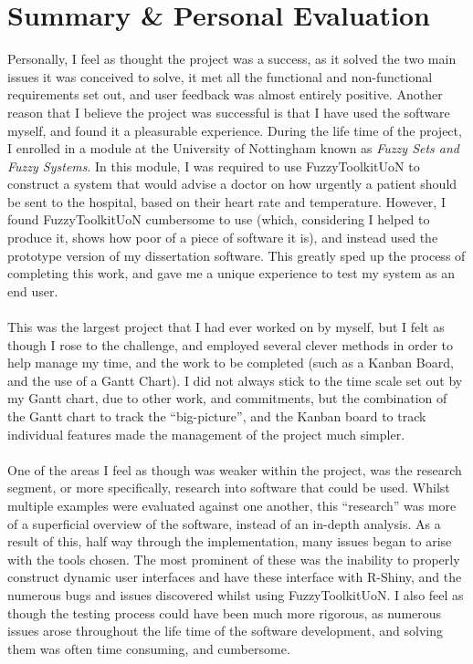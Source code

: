\section{Summary \& Personal Evaluation}
Personally, I feel as thought the project was a success, as it solved the two main issues it was conceived to solve, it met all the functional and non-functional requirements set out, and user feedback was almost entirely positive. Another reason that I believe the project was successful is that I have used the software myself, and found it a pleasurable experience. During the life time of the project, I enrolled in a module at the University of Nottingham known as \emph{Fuzzy Sets and Fuzzy Systems}\cite{uon2014fuz}. In this module, I was required to use FuzzyToolkitUoN to construct a system that would advise a doctor on how urgently a patient should be sent to the hospital, based on their heart rate and temperature. However, I found FuzzyToolkitUoN cumbersome to use (which, considering I helped to produce it, shows how poor of a piece of software it is), and instead used the prototype version of my dissertation software. This greatly sped up the process of completing this work, and gave me a unique experience to test my system as an end user.\ \\
\ \\
This was the largest project that I had ever worked on by myself, but I felt as though I rose to the challenge, and employed several clever methods in order to help manage my time, and the work to be completed (such as a Kanban Board, and the use of a Gantt Chart). I did not always stick to the time scale set out by my Gantt chart, due to other work, and commitments, but the combination of the Gantt chart to track the ``big-picture'', and the Kanban board to track individual features made the management of the project much simpler.\ \\
\ \\
One of the areas I feel as though was weaker within the project, was the research segment, or more specifically, research into software that could be used. Whilst multiple examples were evaluated against one another, this ``research'' was more of a superficial overview of the software, instead of an in-depth analysis. As a result of this, half way through the implementation, many issues began to arise with the tools chosen. The most prominent of these was the inability to properly construct dynamic user interfaces and have these interface with R-Shiny, and the numerous bugs and issues discovered whilst using FuzzyToolkitUoN. I also feel as though the testing process could have been much more rigorous, as numerous issues arose throughout the life time of the software development, and solving them was often time consuming, and cumbersome.\ \\
